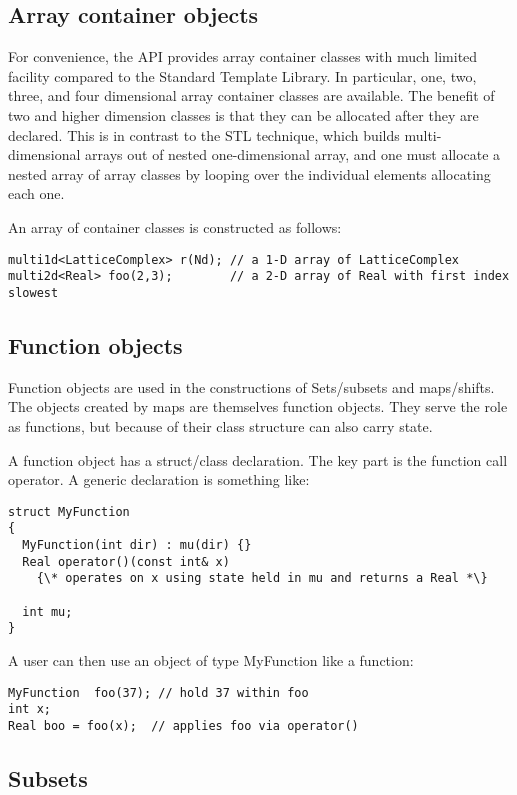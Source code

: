 \documentclass[12pt,letterpaper]{article}
\begin{document}
\subsection{Array container objects}
\label{sec:arrays}

For convenience, the API provides array container classes with much
limited facility compared to the Standard Template Library. In
particular, one, two, three, and four dimensional array container
classes are available. The benefit of two and higher dimension classes
is that they can be allocated after they are declared. This is in
contrast to the STL technique, which builds multi-dimensional arrays
out of nested one-dimensional array, and one must allocate a nested
array of array classes by looping over the individual elements
allocating each one.

An array of container classes is constructed as follows:
%
\begin{verbatim}
multi1d<LatticeComplex> r(Nd); // a 1-D array of LatticeComplex
multi2d<Real> foo(2,3);        // a 2-D array of Real with first index slowest
\end{verbatim}


\subsection{Function objects}
\label{sec:funcobj}

Function objects are used in the constructions of Sets/subsets and
maps/shifts. The objects created by maps are themselves function
objects.  They serve the role as functions, but because of their class
structure can also carry state.

A function object has a struct/class declaration. The key part is
the function call operator. A generic declaration is something like:
%
\begin{verbatim}
struct MyFunction
{
  MyFunction(int dir) : mu(dir) {}
  Real operator()(const int& x)
    {\* operates on x using state held in mu and returns a Real *\}

  int mu;
}
\end{verbatim}

A user can then use an object of type MyFunction like a function:
%
\begin{verbatim}
MyFunction  foo(37); // hold 37 within foo
int x;
Real boo = foo(x);  // applies foo via operator()
\end{verbatim}


\subsection{Subsets}
\end{document}
